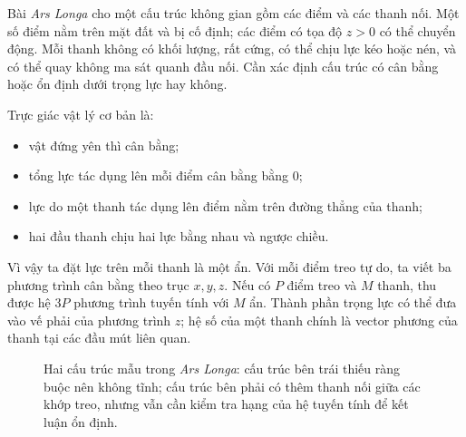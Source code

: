 \documentclass[11pt]{article}
\begin{document}
Bài \textit{Ars Longa} cho một cấu trúc không gian gồm các điểm và các thanh
nối. Một số điểm nằm trên mặt đất và bị cố định; các điểm có tọa độ \(z>0\)
có thể chuyển động. Mỗi thanh không có khối lượng, rất cứng, có thể chịu lực
kéo hoặc nén, và có thể quay không ma sát quanh đầu nối. Cần xác định cấu trúc
có cân bằng hoặc ổn định dưới trọng lực hay không.

Trực giác vật lý cơ bản là:
\begin{itemize}
  \item vật đứng yên thì cân bằng;
  \item tổng lực tác dụng lên mỗi điểm cân bằng bằng \(0\);
  \item lực do một thanh tác dụng lên điểm nằm trên đường thẳng của thanh;
  \item hai đầu thanh chịu hai lực bằng nhau và ngược chiều.
\end{itemize}

Vì vậy ta đặt lực trên mỗi thanh là một ẩn. Với mỗi điểm treo tự do, ta viết
ba phương trình cân bằng theo trục \(x,y,z\). Nếu có \(P\) điểm treo và \(M\)
thanh, thu được hệ \(3P\) phương trình tuyến tính với \(M\) ẩn. Thành phần
trọng lực có thể đưa vào vế phải của phương trình \(z\); hệ số của một thanh
chính là vector phương của thanh tại các đầu mút liên quan.

\begin{figure}[htbp]
\centering
{}
\caption{Hai cấu trúc mẫu trong \textit{Ars Longa}: cấu trúc bên trái thiếu ràng buộc nên không tĩnh; cấu trúc bên phải có thêm thanh nối giữa các khớp treo, nhưng vẫn cần kiểm tra hạng của hệ tuyến tính để kết luận ổn định.}
\end{figure}
\end{document}
